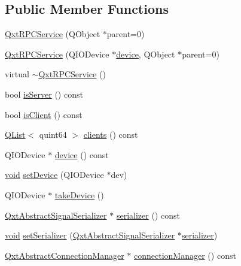 \subsection*{Public Member Functions}
\begin{DoxyCompactItemize}
\item 
\hyperlink{class_qxt_r_p_c_service_a399b02f5839f36f3bed794f048f51530}{Qxt\-R\-P\-C\-Service} (Q\-Object $\ast$parent=0)
\item 
\hyperlink{class_qxt_r_p_c_service_aead492ecb762654be48be9f63bd254fa}{Qxt\-R\-P\-C\-Service} (Q\-I\-O\-Device $\ast$\hyperlink{class_qxt_r_p_c_service_a4eb4de0d4d04cadb92e469eed75bf7e8}{device}, Q\-Object $\ast$parent=0)
\item 
virtual \hyperlink{class_qxt_r_p_c_service_acaa67772390551273cdf421a60448606}{$\sim$\-Qxt\-R\-P\-C\-Service} ()
\item 
bool \hyperlink{class_qxt_r_p_c_service_afa257d10a02bd602d1994ef33027448e}{is\-Server} () const 
\item 
bool \hyperlink{class_qxt_r_p_c_service_a7e98c261583ad87bf80c3783756af0c8}{is\-Client} () const 
\item 
\hyperlink{class_q_list}{Q\-List}$<$ quint64 $>$ \hyperlink{class_qxt_r_p_c_service_af01a9230c41db79851937a34484dd75b}{clients} () const 
\item 
Q\-I\-O\-Device $\ast$ \hyperlink{class_qxt_r_p_c_service_a4eb4de0d4d04cadb92e469eed75bf7e8}{device} () const 
\item 
\hyperlink{group___u_a_v_objects_plugin_ga444cf2ff3f0ecbe028adce838d373f5c}{void} \hyperlink{class_qxt_r_p_c_service_aad1934ec252605d8543a940d4ca8238d}{set\-Device} (Q\-I\-O\-Device $\ast$dev)
\item 
Q\-I\-O\-Device $\ast$ \hyperlink{class_qxt_r_p_c_service_a492fe2088fdb58b8d9dc6d497df6a2de}{take\-Device} ()
\item 
\hyperlink{class_qxt_abstract_signal_serializer}{Qxt\-Abstract\-Signal\-Serializer} $\ast$ \hyperlink{class_qxt_r_p_c_service_a34dd27cfe4af223c4cc5335168a9c203}{serializer} () const 
\item 
\hyperlink{group___u_a_v_objects_plugin_ga444cf2ff3f0ecbe028adce838d373f5c}{void} \hyperlink{class_qxt_r_p_c_service_a4f9f712dd948aed4a65837ab19111305}{set\-Serializer} (\hyperlink{class_qxt_abstract_signal_serializer}{Qxt\-Abstract\-Signal\-Serializer} $\ast$\hyperlink{class_qxt_r_p_c_service_a34dd27cfe4af223c4cc5335168a9c203}{serializer})
\item 
\hyperlink{class_qxt_abstract_connection_manager}{Qxt\-Abstract\-Connection\-Manager} $\ast$ \hyperlink{class_qxt_r_p_c_service_ac86d1c59f3552bcbc88559f2c23edc7c}{connection\-Manager} () const 

\end{DoxyCompactItemize}
